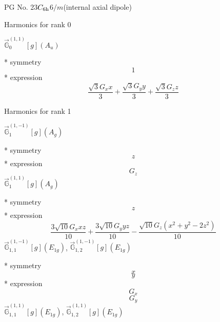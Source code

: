 \documentclass[fleqn,8pt]{jsarticle}
\begin{document}
\setcounter{MaxMatrixCols}{32}

\renewcommand{\tablename}{Table~}
\renewcommand{\figurename}{Figure~}
\begin{center}
\LARGE
PG No. 23\quad$C_{\rm 6h}$\quad$6/m$\quad[ hexagonal ] (internal axial dipole)
\end{center}

\noindent * Harmonics for rank 0

\noindent\quad $\vec{\mathbb{G}}_{0}^{(1,1)}[g](A_{u})$

\noindent\quad ** symmetry
\begin{dmath*}
1
\end{dmath*}
\noindent\quad ** expression
\begin{dmath*}
\frac{\sqrt{3} G_{x} x}{3} + \frac{\sqrt{3} G_{y} y}{3} + \frac{\sqrt{3} G_{z} z}{3}
\end{dmath*}

\noindent * Harmonics for rank 1

\noindent\quad $\vec{\mathbb{G}}_{1}^{(1,-1)}[g](A_{g})$

\noindent\quad ** symmetry
\begin{dmath*}
z
\end{dmath*}
\noindent\quad ** expression
\begin{dmath*}
G_{z}
\end{dmath*}
\noindent\quad $\vec{\mathbb{G}}_{1}^{(1,1)}[g](A_{g})$

\noindent\quad ** symmetry
\begin{dmath*}
z
\end{dmath*}
\noindent\quad ** expression
\begin{dmath*}
\frac{3 \sqrt{10} G_{x} x z}{10} + \frac{3 \sqrt{10} G_{y} y z}{10} - \frac{\sqrt{10} G_{z} \left(x^{2} + y^{2} - 2 z^{2}\right)}{10}
\end{dmath*}
\noindent\quad $\vec{\mathbb{G}}_{1,1}^{(1,-1)}[g](E_{1g})$, $\vec{\mathbb{G}}_{1,2}^{(1,-1)}[g](E_{1g})$

\noindent\quad ** symmetry
\begin{dmath*}
x
\end{dmath*}
\begin{dmath*}
y
\end{dmath*}
\noindent\quad ** expression
\begin{dmath*}
G_{x}
\end{dmath*}
\begin{dmath*}
G_{y}
\end{dmath*}
\noindent\quad $\vec{\mathbb{G}}_{1,1}^{(1,1)}[g](E_{1g})$, $\vec{\mathbb{G}}_{1,2}^{(1,1)}[g](E_{1g})$
\end{document}
